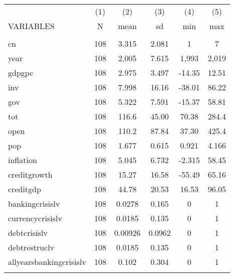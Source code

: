 \documentclass[]{article}
\begin{document}
\begin{tabular}{lccccc} \hline
 & (1) & (2) & (3) & (4) & (5) \\
VARIABLES & N & mean & sd & min & max \\ \hline
 &  &  &  &  &  \\
cn & 108 & 3.315 & 2.081 & 1 & 7 \\
year & 108 & 2,005 & 7.615 & 1,993 & 2,019 \\
gdpgpc & 108 & 2.975 & 3.497 & -14.35 & 12.51 \\
inv & 108 & 7.998 & 16.16 & -38.01 & 86.22 \\
gov & 108 & 5.322 & 7.591 & -15.37 & 58.81 \\
tot & 108 & 116.6 & 45.00 & 70.38 & 284.4 \\
open & 108 & 110.2 & 87.84 & 37.30 & 425.4 \\
pop & 108 & 1.677 & 0.615 & 0.921 & 4.166 \\
inflation & 108 & 5.045 & 6.732 & -2.315 & 58.45 \\
creditgrowth & 108 & 15.27 & 16.58 & -55.49 & 65.16 \\
creditgdp & 108 & 44.78 & 20.53 & 16.53 & 96.05 \\
bankingcrisislv & 108 & 0.0278 & 0.165 & 0 & 1 \\
currencycrisislv & 108 & 0.0185 & 0.135 & 0 & 1 \\
debtcrisislv & 108 & 0.00926 & 0.0962 & 0 & 1 \\
debtrestruclv & 108 & 0.0185 & 0.135 & 0 & 1 \\
allyearsbankingcrisislv & 108 & 0.102 & 0.304 & 0 & 1 \\
 &  &  &  &  &  \\ \hline
\end{tabular}
\end{document}
